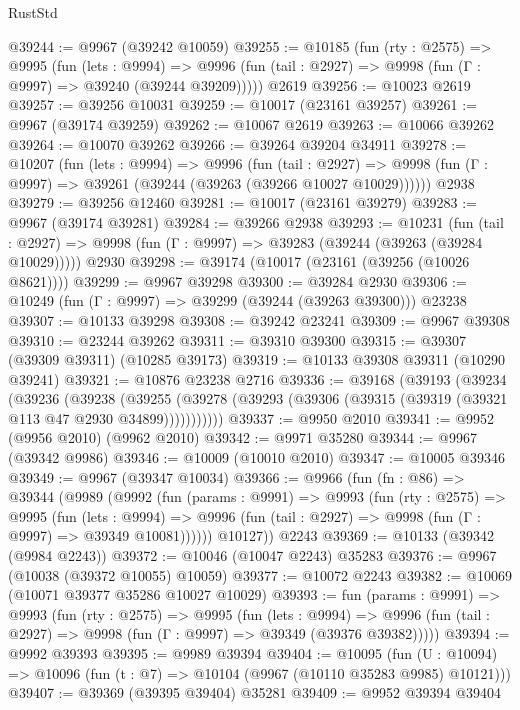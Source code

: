 \begin{lexlean}{RustStd}
\begin{coremodule}
@39244 := @9967 (@39242 @10059)
@39255 := @10185
    (fun (rty : @2575) =>
    @9995
      (fun (lets : @9994) =>
      @9996 (fun (tail : @2927) => @9998 (fun (Γ : @9997) => @39240 (@39244 @39209)))))
    @2619
@39256 := @10023 @2619
@39257 := @39256 @10031
@39259 := @10017 (@23161 @39257)
@39261 := @9967 (@39174 @39259)
@39262 := @10067 @2619
@39263 := @10066 @39262
@39264 := @10070 @39262
@39266 := @39264 @39204 @34911
@39278 := @10207
    (fun (lets : @9994) =>
    @9996
      (fun (tail : @2927) =>
      @9998 (fun (Γ : @9997) => @39261 (@39244 (@39263 (@39266 @10027 @10029))))))
    @2938
@39279 := @39256 @12460
@39281 := @10017 (@23161 @39279)
@39283 := @9967 (@39174 @39281)
@39284 := @39266 @2938
@39293 := @10231
    (fun (tail : @2927) => @9998 (fun (Γ : @9997) => @39283 (@39244 (@39263 (@39284 @10029)))))
    @2930
@39298 := @39174 (@10017 (@23161 (@39256 (@10026 @8621))))
@39299 := @9967 @39298
@39300 := @39284 @2930
@39306 := @10249 (fun (Γ : @9997) => @39299 (@39244 (@39263 @39300))) @23238
@39307 := @10133 @39298
@39308 := @39242 @23241
@39309 := @9967 @39308
@39310 := @23244 @39262
@39311 := @39310 @39300
@39315 := @39307 (@39309 @39311) (@10285 @39173)
@39319 := @10133 @39308 @39311 (@10290 @39241)
@39321 := @10876 @23238 @2716
@39336 := @39168
    (@39193
      (@39234
        (@39236
          (@39238
            (@39255 (@39278 (@39293 (@39306 (@39315 (@39319 (@39321 @113 @47 @2930 @34899)))))))))))
@39337 := @9950 @2010
@39341 := @9952 (@9956 @2010) (@9962 @2010)
@39342 := @9971 @35280
@39344 := @9967 (@39342 @9986)
@39346 := @10009 (@10010 @2010)
@39347 := @10005 @39346
@39349 := @9967 (@39347 @10034)
@39366 := @9966
    (fun (fn : @86) =>
    @39344
      (@9989
        (@9992
          (fun (params : @9991) =>
          @9993
            (fun (rty : @2575) =>
            @9995
              (fun (lets : @9994) =>
              @9996 (fun (tail : @2927) => @9998 (fun (Γ : @9997) => @39349 @10081))))))
        @10127))
    @2243
@39369 := @10133 (@39342 (@9984 @2243))
@39372 := @10046 (@10047 @2243) @35283
@39376 := @9967 (@10038 (@39372 @10055) @10059)
@39377 := @10072 @2243
@39382 := @10069 (@10071 @39377 @35286 @10027 @10029)
@39393 := fun (params : @9991) =>
  @9993
    (fun (rty : @2575) =>
    @9995
      (fun (lets : @9994) =>
      @9996 (fun (tail : @2927) => @9998 (fun (Γ : @9997) => @39349 (@39376 @39382)))))
@39394 := @9992 @39393
@39395 := @9989 @39394
@39404 := @10095
    (fun (U : @10094) => @10096 (fun (t : @7) => @10104 (@9967 (@10110 @35283 @9985) @10121)))
@39407 := @39369 (@39395 @39404) @35281
@39409 := @9952 @39394 @39404

\end{coremodule}
\end{lexlean}
